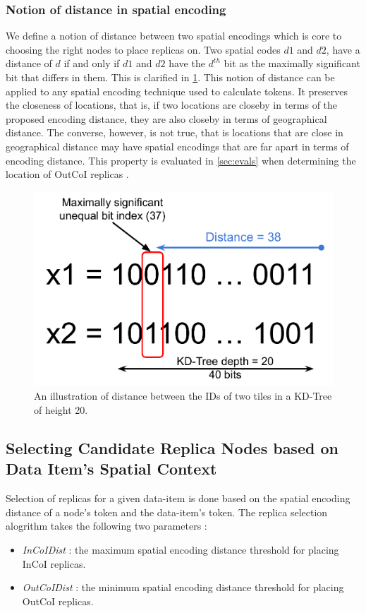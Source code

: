 \subsubsection{Notion of distance in spatial encoding}
\par We define a notion of distance between two spatial encodings which is core to choosing the right nodes to place replicas on. Two spatial codes $d1$ and $d2$, have a distance of $d$ if and only if $d1$ and $d2$ have the $d^{th}$ bit as the maximally significant bit that differs in them. This is clarified in \cref{fig:geohashdist}. This notion of distance can be applied to any spatial encoding technique used to calculate tokens. It preserves the closeness of locations, that is, if two locations are closeby in terms of the proposed encoding distance, they are also closeby in terms of geographical distance. The converse, however, is not true, that is locations that are close in geographical distance may have spatial encodings that are far apart in terms of encoding distance. This property is evaluated in \cref{sec:evals} when determining the location of OutCoI replicas .
\begin{figure}
\centering
\includegraphics[width=0.8\columnwidth]{figures/fogstore/coi_distance.pdf}
\caption{An illustration of distance between the IDs of two tiles in a KD-Tree of height 20.}
\label{fig:geohashdist}
\end{figure}

\subsection{Selecting Candidate Replica Nodes based on Data Item's Spatial Context}
Selection of replicas for a given data-item is done based on the spatial encoding distance of a node's token and the data-item's token. The replica selection alogrithm takes the following two parameters :
\begin{itemize}
\item \emph{InCoIDist} : the maximum spatial encoding distance threshold for placing InCoI replicas. 
\item \emph{OutCoIDist} : the minimum spatial encoding distance threshold for placing OutCoI replicas.  
\end{itemize}

